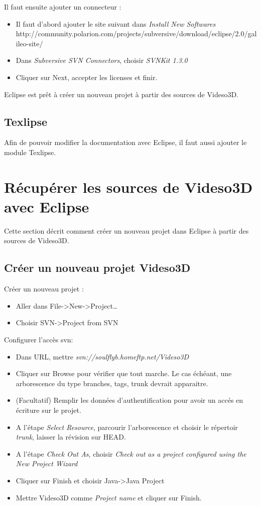 \documentclass[a4paper, titlepage]{article}
\begin{document}
\vspace{\baselineskip}

Il faut ensuite ajouter un connecteur :
\begin{itemize}
  \item Il faut d'abord ajouter le site suivant dans \emph{Install New
  Softwares} http://community.polarion.com/projects/subversive/download/eclipse/2.0/galileo-site/
  \item Dans \emph{Subversive SVN Connectors}, choisir \emph{SVNKit 1.3.0}
  \item Cliquer sur Next, accepter les licenses et finir.
\end{itemize}

\vspace{\baselineskip}
Eclipse est prêt à créer un nouveau projet à partir des sources de Videso3D.

\subsection{Texlipse}
Afin de pouvoir modifier la documentation avec Eclipse, il faut aussi ajouter
le module Texlipse.


\section{Récupérer les sources de Videso3D avec Eclipse}
Cette section décrit comment créer un nouveau projet dans Eclipse à partir des
sources de Videso3D.

\subsection{Créer un nouveau projet Videso3D}

Créer un nouveau projet :
\begin{itemize}
  \item Aller dans File->New->Project\ldots
  \item Choisir SVN->Project from SVN
\end{itemize}

\vspace{\baselineskip}
Configurer l'accès svn:
\begin{itemize}
  \item Dans URL, mettre \emph{svn://soulflyb.homeftp.net/Videso3D}
  \item Cliquer sur Browse pour vérifier que tout marche. Le cas échéant, une
  arborescence du type branches, tags, trunk devrait apparaitre.
  \item (Facultatif) Remplir les données d'authentification pour avoir un
  accés en écriture sur le projet.
  \item A l'étape \emph{Select Resource}, parcourir l'arborescence et choisir
  le répertoir \emph{trunk}, laisser la révision sur HEAD.
  \item A l'étape \emph{Check Out As}, choisir \emph{Check out as a project
  configured using the New Project Wizard}
  \item Cliquer sur Finish et choisir Java->Java Project
  \item Mettre Videso3D comme \emph{Project name} et cliquer sur Finish.
\end{itemize}
\end{document}
